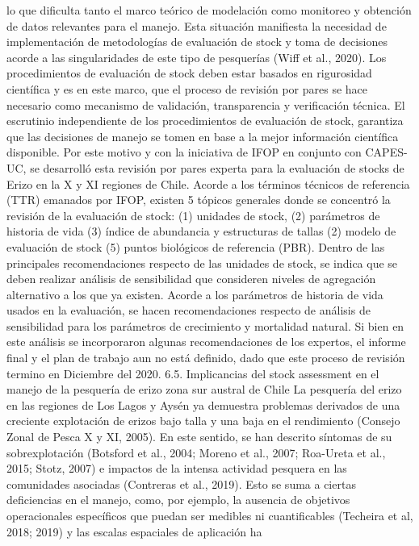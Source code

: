 \documentclass[
]{article}
\begin{document}
lo que dificulta tanto el marco teórico de modelación como monitoreo y
obtención de datos relevantes para el manejo. Esta situación manifiesta
la necesidad de implementación de metodologías de evaluación de stock y
toma de decisiones acorde a las singularidades de este tipo de
pesquerías (Wiff et al., 2020). Los procedimientos de evaluación de
stock deben estar basados en rigurosidad científica y es en este marco,
que el proceso de revisión por pares se hace necesario como mecanismo de
validación, transparencia y verificación técnica. El escrutinio
independiente de los procedimientos de evaluación de stock, garantiza
que las decisiones de manejo se tomen en base a la mejor información
científica disponible. Por este motivo y con la iniciativa de IFOP en
conjunto con CAPES-UC, se desarrolló esta revisión por pares experta
para la evaluación de stocks de Erizo en la X y XI regiones de Chile.
Acorde a los términos técnicos de referencia (TTR) emanados por IFOP,
existen 5 tópicos generales donde se concentró la revisión de la
evaluación de stock: (1) unidades de stock, (2) parámetros de historia
de vida (3) índice de abundancia y estructuras de tallas (2) modelo de
evaluación de stock (5) puntos biológicos de referencia (PBR). Dentro de
las principales recomendaciones respecto de las unidades de stock, se
indica que se deben realizar análisis de sensibilidad que consideren
niveles de agregación alternativo a los que ya existen. Acorde a los
parámetros de historia de vida usados en la evaluación, se hacen
recomendaciones respecto de análisis de sensibilidad para los parámetros
de crecimiento y mortalidad natural. Si bien en este análisis se
incorporaron algunas recomendaciones de los expertos, el informe final y
el plan de trabajo aun no está definido, dado que este proceso de
revisión termino en Diciembre del 2020. 6.5. Implicancias del stock
assessment en el manejo de la pesquería de erizo zona sur austral de
Chile La pesquería del erizo en las regiones de Los Lagos y Aysén ya
demuestra problemas derivados de una creciente explotación de erizos
bajo talla y una baja en el rendimiento (Consejo Zonal de Pesca X y XI,
2005). En este sentido, se han descrito síntomas de su sobrexplotación
(Botsford et al., 2004; Moreno et al., 2007; Roa-Ureta et al., 2015;
Stotz, 2007) e impactos de la intensa actividad pesquera en las
comunidades asociadas (Contreras et al., 2019). Esto se suma a ciertas
deficiencias en el manejo, como, por ejemplo, la ausencia de objetivos
operacionales específicos que puedan ser medibles ni cuantificables
(Techeira et al, 2018; 2019) y las escalas espaciales de aplicación ha
\end{document}

